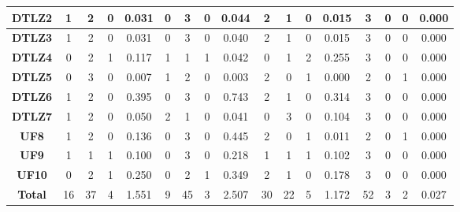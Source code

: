 \begin{table*}[t]
\begin{tabular}{c c|c|c|c|c|c|c|c|c|c|c|c|c|c|c|c}
\multicolumn{1}{c|}{\textbf{DTLZ2}} & 1 & 2 & 0 & 0.031 & 0 & 3 & 0 & 0.044 & 2 & 1 & 0 & 0.015 & 3 & 0 & 0 & 0.000 \\ \hline
\multicolumn{1}{c|}{\textbf{DTLZ3}} & 1 & 2 & 0 & 0.031 & 0 & 3 & 0 & 0.040 & 2 & 1 & 0 & 0.015 & 3 & 0 & 0 & 0.000 \\ \hline
\multicolumn{1}{c|}{\textbf{DTLZ4}} & 0 & 2 & 1 & 0.117 & 1 & 1 & 1 & 0.042 & 0 & 1 & 2 & 0.255 & 3 & 0 & 0 & 0.000 \\ \hline
\multicolumn{1}{c|}{\textbf{DTLZ5}} & 0 & 3 & 0 & 0.007 & 1 & 2 & 0 & 0.003 & 2 & 0 & 1 & 0.000 & 2 & 0 & 1 & 0.000 \\ \hline
\multicolumn{1}{c|}{\textbf{DTLZ6}} & 1 & 2 & 0 & 0.395 & 0 & 3 & 0 & 0.743 & 2 & 1 & 0 & 0.314 & 3 & 0 & 0 & 0.000 \\ \hline
\multicolumn{1}{c|}{\textbf{DTLZ7}} & 1 & 2 & 0 & 0.050 & 2 & 1 & 0 & 0.041 & 0 & 3 & 0 & 0.104 & 3 & 0 & 0 & 0.000 \\ \hline
\multicolumn{1}{c|}{\textbf{UF8}} & 1 & 2 & 0 & 0.136 & 0 & 3 & 0 & 0.445 & 2 & 0 & 1 & 0.011 & 2 & 0 & 1 & 0.000 \\ \hline
\multicolumn{1}{c|}{\textbf{UF9}} & 1 & 1 & 1 & 0.100 & 0 & 3 & 0 & 0.218 & 1 & 1 & 1 & 0.102 & 3 & 0 & 0 & 0.000 \\ \hline
\multicolumn{1}{c|}{\textbf{UF10}} & 0 & 2 & 1 & 0.250 & 0 & 2 & 1 & 0.349 & 2 & 1 & 0 & 0.178 & 3 & 0 & 0 & 0.000 \\ \hline
\multicolumn{1}{c|}{\textbf{Total}} & 16 & 37 & 4 & 1.551 & 9 & 45 & 3 & 2.507 & 30 & 22 & 5 & 1.172 & 52 & 3 & 2 & 0.027 \\ \hline
\end{tabular}%
\end{table*}


